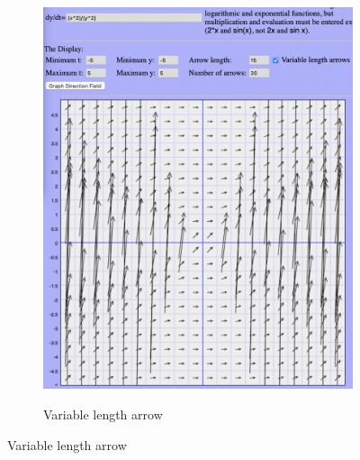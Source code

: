 \documentclass{article}
\begin{document}
\begin{figure}[h!]
\begin{subfigure}[b]{0.4\textwidth}
        \centering
        \includegraphics[width=\textwidth]{./images/x^2=y^2_arrow_length.png} \\
        \caption{Variable length arrow}
        \label{fig:xjsdfk x}
    \end{subfigure}
\end{figure}

\end{document}
